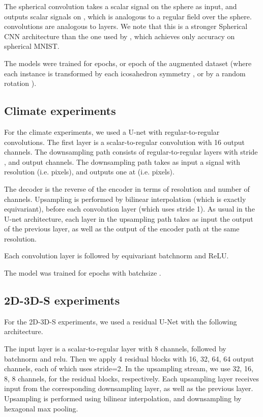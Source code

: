 \documentclass{article}
\begin{document}
The spherical convolution takes a scalar signal on the sphere as input, and outputs scalar signals on , which is analogous to a regular field over the sphere.
 convolutions are analogous to  layers.
We note that this is a stronger Spherical CNN architecture than the one used by \cite{cohenSphericalCNNs2018}, which achieves only  accuracy on spherical MNIST.

The models were trained for  epochs, or  epoch of the  augmented dataset (where each instance is transformed by each icosahedron symmetry , or by a random rotation ).



\subsection{Climate experiments}

For the climate experiments, we used a U-net with regular-to-regular convolutions. 
The first layer is a scalar-to-regular convolution with 16 output channels.
The downsampling path consists of  regular-to-regular layers with stride , and  output channels.
The downsampling path takes as input a signal with resolution  (i.e.  pixels), and outputs one at  (i.e.  pixels).

The decoder is the reverse of the encoder in terms of resolution and number of channels.
Upsampling is performed by bilinear interpolation (which is exactly equivariant), before each convolution layer (which uses stride 1).
As usual in the U-net architecture, each layer in the upsampling path takes as input the output of the previous layer, as well as the output of the encoder path at the same resolution.

Each convolution layer is followed by equivariant batchnorm and ReLU.

The model was trained for  epochs with batchsize .


\subsection{2D-3D-S experiments}

For the 2D-3D-S experiments, we used a residual U-Net with the following architecture.

The input layer is a scalar-to-regular layer with 8 channels, followed by batchnorm and relu.
Then we apply 4 residual blocks with 16, 32, 64, 64 output channels, each of which uses stride=2.
In the upsampling stream, we use 32, 16, 8, 8 channels, for the residual blocks, respectively.
Each upsampling layer receives input from the corresponding downsampling layer, as well as the previous layer.
Upsampling is performed using bilinear interpolation, and downsampling by hexagonal max pooling.
\end{document}
